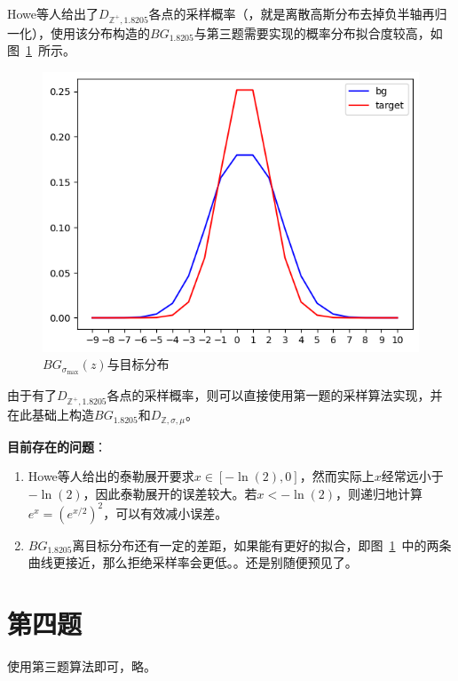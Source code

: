 \documentclass{article}
\begin{document}
    Howe等人\cite{q3}给出了$D_{\mathbb{Z}^+, 1.8205}$各点的采样概率（，就是离散高斯分布去掉负半轴再归一化），使用该分布构造的$BG_{1.8205}$与第三题需要实现的概率分布拟合度较高，如图~\ref{fig:q3}~所示。
    \begin{figure}[htb]
        \centering
        \includegraphics[width=.6\textwidth]{q3_0.5.png}
        \caption{$BG_{\sigma_{\mathrm{max}}}(z)$与目标分布}
        \label{fig:q3}
    \end{figure}

    由于有了$D_{\mathbb{Z}^+, 1.8205}$各点的采样概率，则可以直接使用第一题的采样算法实现，并在此基础上构造$BG_{1.8205}$和$D_{\mathbb{Z}, \sigma, \mu}$。

    \textbf{目前存在的问题}：
    \begin{enumerate}
        \item {}
        
        Howe等人给出的泰勒展开要求$x \in [-\ln(2), 0]$，然而实际上$x$经常远小于$-\ln(2)$，因此泰勒展开的误差较大。若$x < -\ln(2)$，则递归地计算$e^x = (e^{x/2})^2$，可以有效减小误差。

        \item $BG_{1.8205}$离目标分布还有一定的差距，如果能有更好的拟合，即图~\ref{fig:q3}~中的两条曲线更接近，那么拒绝采样率会更低。。还是别随便预见了。
    \end{enumerate}

    \section{第四题}
    使用第三题算法即可，略。
\end{document}

